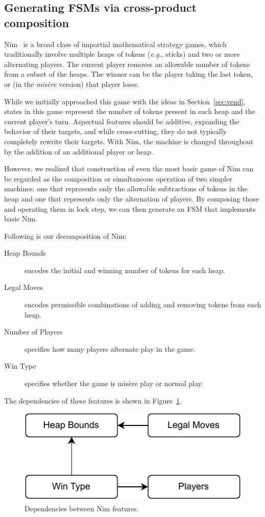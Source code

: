 \documentclass[sigplan,anonymous,review]{acmart}
\begin{document}
\subsection{Generating FSMs via cross-product composition}\label{sec:nim}

Nim~\cite{enwiki:1102668015} is a broad class of impartial mathematical strategy games, which traditionally involve multiple heaps of tokens (\textit{e.g.}, sticks) and two or more alternating players. The current player removes an allowable number of tokens from a subset of the heaps. The winner can be the player taking the last token, or (in the \textit{mis\`{e}re} version) that player loses.

While we initially approached this game with the ideas in Section~\ref{sec:vend}, states in this game represent the number of tokens present in each heap and the current player's turn.  Aspectual features should be additive, expanding the behavior of their targets, and while cross-cutting, they do not typically completely rewrite their targets.  With Nim, the machine is changed throughout by the addition of an additional player or heap.   

However, we realized that construction of even the most basic game of Nim can be regarded as the composition or simultaneous operation of two simpler machines:   one that represents only the allowable subtractions of tokens in the heap and one that represents only the alternation of players.   By composing those and operating them in lock step, we can then generate an FSM that implements basic Nim.

Following is our decomposition of Nim:
\begin{description}
    \item[Heap Bounds] encodes the initial and winning number of tokens for each heap.
    \item[Legal Moves] encodes permissible combinations of adding and removing tokens from each heap.
    \item[Number of Players] specifies how many players alternate play in the game.
    \item[Win Type] specifies whether the game is mis\`{e}re play or normal play.
\end{description}
The dependencies of these features is shown in Figure~\ref{fig:nimDependencies}.  

\begin{figure}
    \centering
    \includegraphics[width=0.5\linewidth]{figures/NimFeatures.pdf}
    \caption{Dependencies between Nim features.}
    \label{fig:nimDependencies}
\end{figure}
\end{document}

